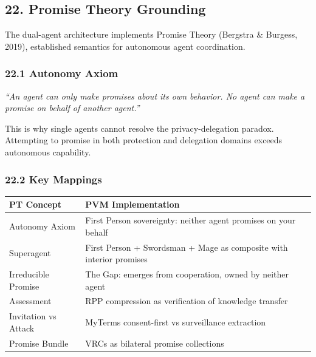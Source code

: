 \documentclass[
  11pt,
]{article}
\newcounter{none} %
\begin{document}
\subsection{22. Promise Theory
Grounding}\label{promise-theory-grounding}

The dual-agent architecture implements Promise Theory (Bergstra \&
Burgess, 2019), established semantics for autonomous agent coordination.

\subsubsection{22.1 Autonomy Axiom}\label{autonomy-axiom}

\emph{``An agent can only make promises about its own behavior. No agent
can make a promise on behalf of another agent.''}

This is why single agents cannot resolve the privacy-delegation paradox.
Attempting to promise in both protection and delegation domains exceeds
autonomous capability.

\subsubsection{22.2 Key Mappings}\label{key-mappings}

{\def\LTcaptype{none} %
\begin{longtable}[]{@{}
  >{\raggedright\arraybackslash}p{}
  >{\raggedright\arraybackslash}p{}@{}}
\toprule\noalign{}
\begin{minipage}[b]{\linewidth}\raggedright
PT Concept
\end{minipage} & \begin{minipage}[b]{\linewidth}\raggedright
PVM Implementation
\end{minipage} \\
\midrule\noalign{}
\endhead
\bottomrule\noalign{}
\endlastfoot
Autonomy Axiom & First Person sovereignty: neither agent promises on
your behalf \\
Superagent & First Person + Swordsman + Mage as composite with interior
promises \\
Irreducible Promise & The Gap: emerges from cooperation, owned by
neither agent \\
Assessment & RPP compression as verification of knowledge transfer \\
Invitation vs Attack & MyTerms consent-first vs surveillance
extraction \\
Promise Bundle & VRCs as bilateral promise collections \\
\end{longtable}
}
\end{document}
